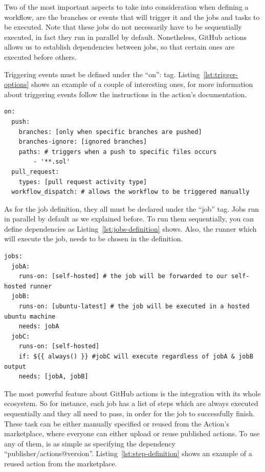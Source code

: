 Two of the most important aspects to take into consideration when defining a workflow, are the branches or events that will trigger it and the jobs and tasks to be executed. Note that these jobs do not necessarily have to be sequentially executed, in fact they run in parallel by default. Nonetheless, GitHub actions allows us to establish dependencies between jobs, so that certain ones are executed before others.

Triggering events must be defined under the \enquote{on}: tag. Listing~\ref{lst:trigger-options} shows an example of a couple of interesting ones, for more information about triggering events follow the instructions in the action's documentation.

\begin{lstlisting}[caption=Common Workflow Triggers,label={lst:trigger-options}]
on:
  push:
    branches: [only when specific branches are pushed]
    branches-ignore: [ignored branches]
    paths: # triggers when a push to specific files occurs
        - '**.sol'
  pull_request:
    types: [pull request activity type]
  workflow_dispatch: # allows the workflow to be triggered manually
\end{lstlisting}

As for the job definition, they all must be declared under the \enquote{job} tag. Jobs run in parallel by default as we explained before. To run them sequentially, you can define dependencies as Listing~\ref{lst:jobs-definition} shows. Also, the runner which will execute the job, needs to be chosen in the definition.

\begin{lstlisting}[caption=Job Dependencies Definition,label={lst:jobs-definition}]
jobs:
  jobA:
    runs-on: [self-hosted] # the job will be forwarded to our self-hosted runner
  jobB:
    runs-on: [ubuntu-latest] # the job will be executed in a hosted ubuntu machine
    needs: jobA
  jobC:
    runs-on: [self-hosted]
    if: ${{ always() }} #jobC will execute regardless of jobA & jobB output
    needs: [jobA, jobB]
\end{lstlisting}

The most powerful feature about GitHub actions is the integration with its whole ecosystem. So for instance, each job has a list of steps which are always executed sequentially and they all need to pass, in order for the job to successfully finish. These task can be either manually specified or reused from the Action's marketplace, where everyone can either upload or reuse published actions. To use any of them, is as simple as specifying the dependency \enquote{publisher/actions@version}. Listing~\ref{lst:step-definition} shows an example of a reused action from the marketplace.

